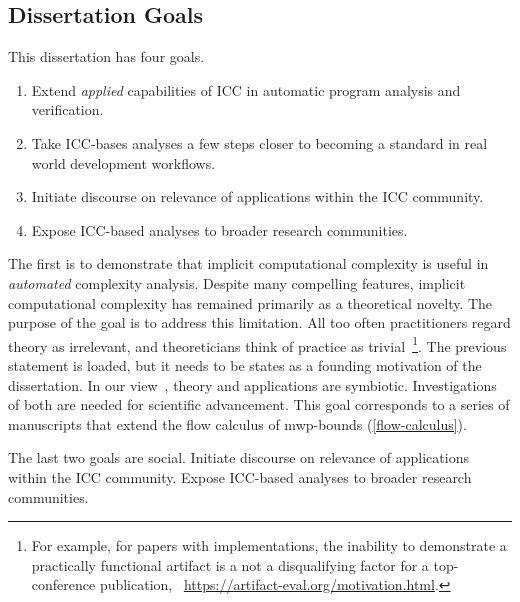 \subsection{Dissertation Goals}\label{subsec:specific-aims}

This dissertation has four goals.

\begin{enumerate}
\item Extend \emph{applied} capabilities of ICC in automatic program analysis and verification.
\item Take ICC-bases analyses a few steps closer to becoming a standard in real world development workflows.
\item Initiate discourse on relevance of applications within the ICC community.
\item Expose ICC-based analyses to broader research communities.
\end{enumerate}

The first is to demonstrate that implicit computational complexity is useful in \emph{automated} complexity analysis.
Despite many compelling features, implicit computational complexity has remained primarily as a theoretical novelty.
The purpose of the goal is to address this limitation.
All too often practitioners regard theory as irrelevant, and theoreticians think of practice as trivial~\cite[pg. xxxv]{bishop2003}\footnote{
For example, for papers with implementations, the inability to demonstrate a practically functional artifact is a not a disqualifying factor for a top-conference publication,
\cf\eg~\url{https://artifact-eval.org/motivation.html}.}.
The previous statement is loaded, but it needs to be states as a founding motivation of the dissertation.
In our view~\cite[p. 75]{moyen2017}, theory and applications are symbiotic.
Investigations of both are needed for scientific advancement.
This goal corresponds to a series of manuscripts that extend the flow calculus of mwp-bounds (\autoref{flow-calculus}).

The last two goals are social.
Initiate discourse on relevance of applications within the ICC community.
Expose ICC-based analyses to broader research communities.


